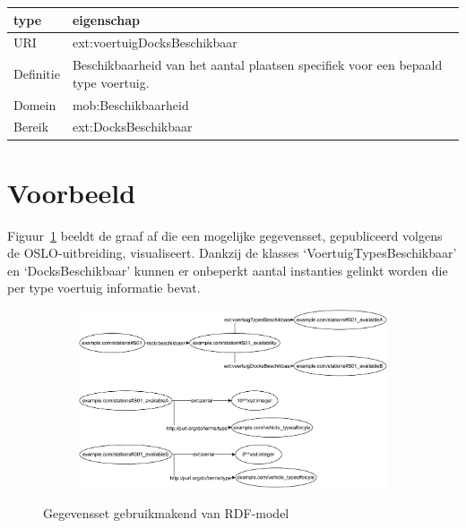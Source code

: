 \begin{table}[h]
\centering
\begin{tabular}{|l|l|}
\hline
\textbf{type}     & \textbf{eigenschap} \\ \hline
URI               & ext:voertuigDocksBeschikbaar \\ \hline
Definitie         & Beschikbaarheid van het aantal plaatsen specifiek voor een bepaald type voertuig.  \\ \hline
Domein & mob:Beschikbaarheid \\ \hline
Bereik & ext:DocksBeschikbaar \\ \hline
\end{tabular}
\end{table}

\section{Voorbeeld}
Figuur~\ref{fig:rdf_gegevensset_voorbeeld} beeldt de graaf af die een mogelijke gegevensset, gepubliceerd volgens de OSLO-uitbreiding, visualiseert. Dankzij de klasses `VoertuigTypesBeschikbaar' en `DocksBeschikbaar' kunnen er onbeperkt aantal instanties gelinkt worden die per type voertuig informatie bevat.

\begin{figure}[h]
	\centering
	\begin{subfigure}{\textwidth}
		\centering
		\centerline{
			\includegraphics[width=\textwidth]{images/rdf_dataset.pdf}
		}
	\end{subfigure}
	\caption{Gegevensset gebruikmakend van RDF-model}
	\label{fig:rdf_gegevensset_voorbeeld}
\end{figure}